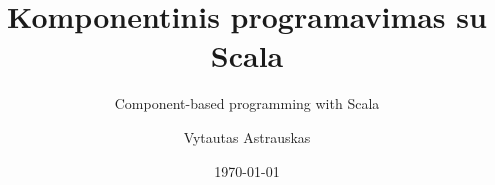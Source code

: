 \documentclass[xetex,mathserif,serif]{beamer}
\title{Komponentinis programavimas su Scala}
\subtitle{Component-based programming with Scala}
\author{Vytautas Astrauskas}
\institute{
Vilniaus universitetas\\
Matematikos ir informatikos fakultetas\\
Programų sistemų katedra%
}
\date{\today}
\begin{document}
  \frame{\titlepage}


  
\end{document}
